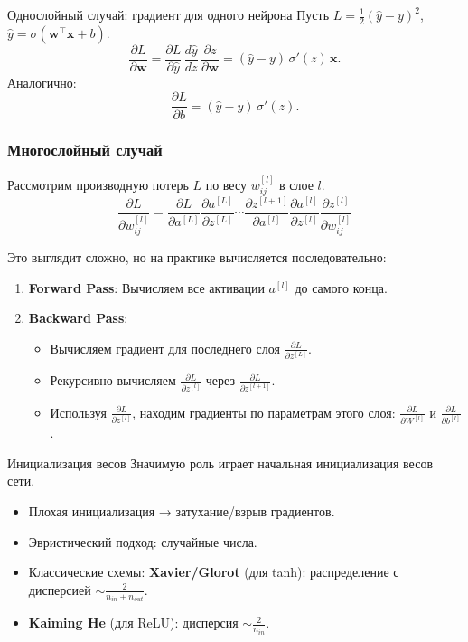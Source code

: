 \documentclass[notheorems, handout]{beamer}
\begin{document}
\begin{frame}{Однослойный случай: градиент для одного нейрона}
  Пусть $L=\tfrac12(\hat y - y)^2$, $\hat y = \sigma(\bm{w}^\top \bm{x}+b)$.
  \[
    \frac{\partial L}{\partial \bm{w}} = \frac{\partial L}{\partial \hat y}\,\frac{d\hat y}{dz}\,\frac{\partial z}{\partial \bm{w}}
    = (\hat y - y)\,\sigma'(z)\,\bm{x}.
  \]
  Аналогично:
  \[
    \frac{\partial L}{\partial b} = (\hat y - y)\,\sigma'(z).
  \]
\end{frame}
\begin{frame}
    \frametitle{Многослойный случай}
    Рассмотрим производную потерь $L$ по весу $w_{ij}^{[l]}$ в слое $l$.
    \[ \frac{\partial L}{\partial w_{ij}^{[l]}} = \frac{\partial L}{\partial a^{[L]}} \frac{\partial a^{[L]}}{\partial z^{[L]}} \cdots \frac{\partial z^{[l+1]}}{\partial a^{[l]}} \frac{\partial a^{[l]}}{\partial z^{[l]}} \frac{\partial z^{[l]}}{\partial w_{ij}^{[l]}} \]
    
    Это выглядит сложно, но на практике вычисляется последовательно:
    \begin{enumerate}
        \item \textbf{Forward Pass}: Вычисляем все активации $a^{[l]}$ до самого конца.
        \item \textbf{Backward Pass}:
            \begin{itemize}
                \item Вычисляем градиент для последнего слоя $\frac{\partial L}{\partial z^{[L]}}$.
                \item Рекурсивно вычисляем $\frac{\partial L}{\partial z^{[l]}}$ через $\frac{\partial L}{\partial z^{[l+1]}}$.
                \item Используя $\frac{\partial L}{\partial z^{[l]}}$, находим градиенты по параметрам этого слоя: $\frac{\partial L}{\partial W^{[l]}}$ и $\frac{\partial L}{\partial b^{[l]}}$.
            \end{itemize}
    \end{enumerate}
\end{frame}
\begin{frame}{Инициализация весов}
Значимую роль играет начальная инициализация весов сети.
  \begin{itemize}
    \item Плохая инициализация → затухание/взрыв градиентов.
    \item Эвристический подход: случайные числа.
    \item Классические схемы: \textbf{Xavier/Glorot} (для tanh): распределение с дисперсией $\sim\frac{2}{n_{in}+n_{out}}$.
    \item \textbf{Kaiming He} (для ReLU): дисперсия $\sim\frac{2}{n_{in}}$.
  \end{itemize}
\end{frame}
\end{document}

